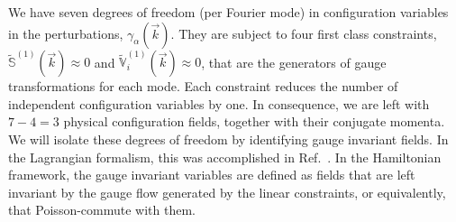 \documentclass[11pt,tightenlines,eqsecnum,floats,aps,amsmath,amssymb,nofootinbib,prd,floatfix]{revtex4}
\def\v{\vec}
\newcommand{\<}{\langle}
\renewcommand{\>}{\rangle}
\begin{document}
We have seven degrees of freedom (per Fourier mode) in configuration variables in the perturbations,  $\gamma_{\alpha}(\vec k)$.  They are  subject to four first class constraints, $\tilde {\mathbb S}^{(1)}(\v k)\approx 0$ and $\tilde  {\mathbb V}_i^{(1)}(\v k)\approx 0$, that  are the generators of gauge transformations for each mode. Each constraint  reduces the number of independent configuration variables by one. In consequence, we are left with $7-4=3$ physical configuration fields, together with their conjugate momenta. We will isolate these degrees of freedom by identifying gauge invariant fields. In the Lagrangian formalism, this was accomplished in Ref.\ \cite{Pereira:2007yy}. In the Hamiltonian framework, the gauge invariant variables are defined  as fields that are left invariant by the gauge flow generated by the linear constraints, or equivalently, that  Poisson-commute with them. %
\end{document}
